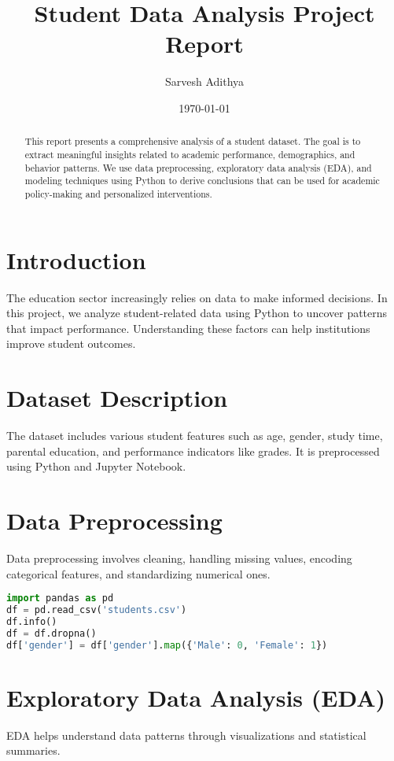\documentclass[12pt]{article}
\title{\textbf{Student Data Analysis Project Report}}
\author{Sarvesh Adithya}
\date{\today}
\begin{document}
\maketitle

\begin{abstract}
This report presents a comprehensive analysis of a student dataset. The goal is to extract meaningful insights related to academic performance, demographics, and behavior patterns. We use data preprocessing, exploratory data analysis (EDA), and modeling techniques using Python to derive conclusions that can be used for academic policy-making and personalized interventions.
\end{abstract}

\section{Introduction}
The education sector increasingly relies on data to make informed decisions. In this project, we analyze student-related data using Python to uncover patterns that impact performance. Understanding these factors can help institutions improve student outcomes.

\section{Dataset Description}
The dataset includes various student features such as age, gender, study time, parental education, and performance indicators like grades. It is preprocessed using Python and Jupyter Notebook.

\section{Data Preprocessing}
Data preprocessing involves cleaning, handling missing values, encoding categorical features, and standardizing numerical ones.

\begin{lstlisting}[language=Python, caption=Data Preprocessing]
import pandas as pd
df = pd.read_csv('students.csv')
df.info()
df = df.dropna()
df['gender'] = df['gender'].map({'Male': 0, 'Female': 1})
\end{lstlisting}

\section{Exploratory Data Analysis (EDA)}
EDA helps understand data patterns through visualizations and statistical summaries.
\end{document}
